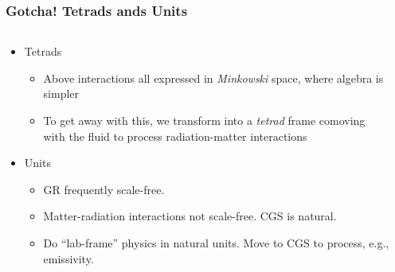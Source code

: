 \documentclass[]{beamer}
\begin{document}
\begin{frame}
  \frametitle{Gotcha! Tetrads ands Units}
  \begin{columns}
    \begin{column}{6cm}
      \begin{itemize}
      \item Tetrads
      \begin{itemize}
      \item Above interactions all expressed in \textit{Minkowski} space, where algebra is simpler
      \item To get away with this, we transform into a \textit{tetrad}
        frame comoving with the fluid to process radiation-matter
        interactions
      \end{itemize}
    \item Units
      \begin{itemize}
      \item GR frequently scale-free.
      \item Matter-radiation interactions not scale-free. CGS is natural.
      \item Do ``lab-frame'' physics in natural units. Move to CGS to
        process, e.g., emissivity.
      \end{itemize}
      \end{itemize}
    \end{column}
    \begin{column}{6cm}
    \end{column}
  \end{columns}
\end{frame}
\end{document}
